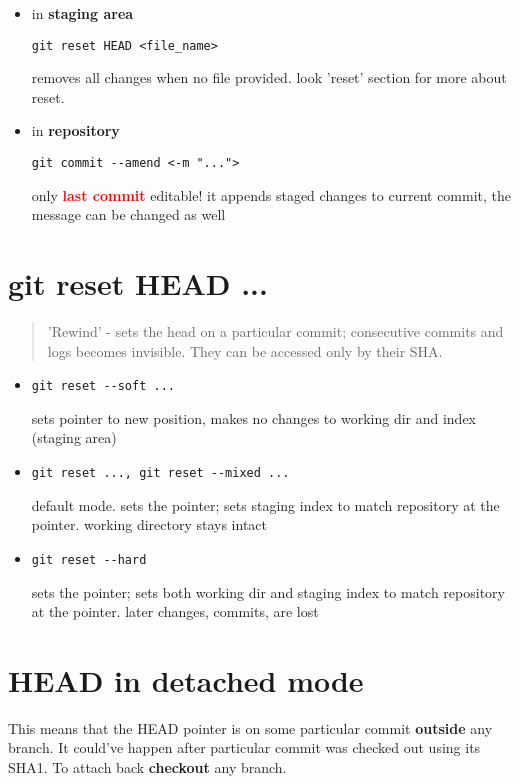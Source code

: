\documentclass{report}
\begin{document}
\begin{itemize}
\item in \textbf{staging area}
\begin{verbatim}
git reset HEAD <file_name>
\end{verbatim}
removes all changes when no file provided. look 'reset' section for more about reset.

\item in \textbf{repository}
\begin{verbatim}
git commit --amend <-m "...">
\end{verbatim}
only \textcolor{red}{\textbf{last commit}} editable! it appends staged changes to current commit, the message can be changed as well
\end{itemize}

\section{git reset HEAD ...}
\begin{quotation}
'Rewind' - sets the head on a particular commit; consecutive commits and logs becomes invisible. They can be accessed only by their SHA.
\end{quotation}
\begin{itemize}
\item \begin{verbatim}
git reset --soft ...
\end{verbatim}
sets pointer to new position, makes no changes to working dir and index (staging area)

\item \begin{verbatim}
git reset ..., git reset --mixed ...
\end{verbatim}
default mode. sets the pointer; sets staging index to match repository at the pointer. working directory stays intact

\item \begin{verbatim}
git reset --hard
\end{verbatim}
sets the pointer; sets both working dir and staging index to match repository at the pointer. later changes, commits, are lost
\end{itemize}

\section{HEAD in detached mode}
This means that the HEAD pointer is on some particular commit \textbf{outside} any branch. It could've happen after particular commit was checked out using its SHA1. To attach back \textbf{checkout} any branch.
\end{document}
